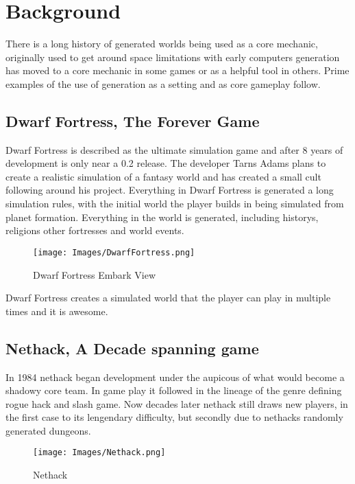 \section{Background}
There is a long history of generated worlds being used as a core mechanic, 
originally used to get around space limitations with early computers generation
has moved to a core mechanic in some games or as a helpful tool in others. Prime
examples of the use of generation as a setting and as core gameplay follow.\\

\subsection*{Dwarf Fortress, The Forever Game}
Dwarf Fortress is described as the ultimate simulation game and after 8 years of
development is only near a 0.2 release. The developer Tarns Adams plans to create
a realistic simulation of a fantasy world and has created a small cult following
around his project. Everything in Dwarf Fortress is generated a long simulation
rules, with the initial world the player builds in being simulated from planet 
formation. Everything in the world is generated, including historys, religions
other fortresses and world events. \\


\begin{figure}[h!]
  \texttt{[image: Images/DwarfFortress.png]}
  \caption{Dwarf Fortress Embark View}
\end{figure}

Dwarf Fortress creates a simulated world that the player can play in multiple 
times and it is awesome.\\

\subsection*{Nethack, A Decade spanning game}
In 1984 nethack began development under the aupicous of what would become a 
shadowy core team. In game play it followed in the lineage of the genre defining
rogue hack and slash game. Now decades later nethack still draws new players,
in the first case to its lengendary difficulty, but secondly due to nethacks 
randomly generated dungeons.\\ 

\begin{figure}[h!]
  \texttt{[image: Images/Nethack.png]}
  \caption{Nethack}
\end{figure}

